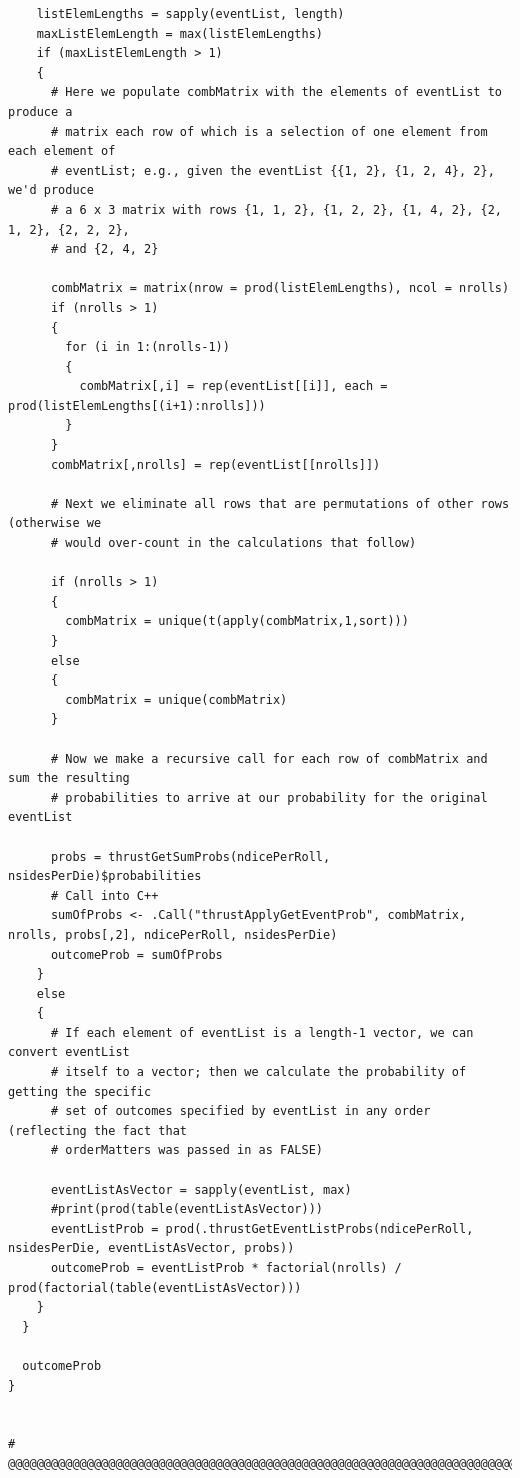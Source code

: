 \documentclass[12pt]{article}
\begin{document}
\begin{lstlisting}
    listElemLengths = sapply(eventList, length)
    maxListElemLength = max(listElemLengths)
    if (maxListElemLength > 1)
    {
      # Here we populate combMatrix with the elements of eventList to produce a 
      # matrix each row of which is a selection of one element from each element of
      # eventList; e.g., given the eventList {{1, 2}, {1, 2, 4}, 2}, we'd produce
      # a 6 x 3 matrix with rows {1, 1, 2}, {1, 2, 2}, {1, 4, 2}, {2, 1, 2}, {2, 2, 2},
      # and {2, 4, 2}
      
      combMatrix = matrix(nrow = prod(listElemLengths), ncol = nrolls)
      if (nrolls > 1)
      {
        for (i in 1:(nrolls-1))
        {
          combMatrix[,i] = rep(eventList[[i]], each = prod(listElemLengths[(i+1):nrolls]))
        }
      }
      combMatrix[,nrolls] = rep(eventList[[nrolls]])
      
      # Next we eliminate all rows that are permutations of other rows (otherwise we
      # would over-count in the calculations that follow)
      
      if (nrolls > 1)
      {
        combMatrix = unique(t(apply(combMatrix,1,sort)))
      }
      else
      {
        combMatrix = unique(combMatrix)
      }
      
      # Now we make a recursive call for each row of combMatrix and sum the resulting
      # probabilities to arrive at our probability for the original eventList
      
      probs = thrustGetSumProbs(ndicePerRoll, nsidesPerDie)$probabilities
      # Call into C++
      sumOfProbs <- .Call("thrustApplyGetEventProb", combMatrix, nrolls, probs[,2], ndicePerRoll, nsidesPerDie)
      outcomeProb = sumOfProbs
    }
    else
    {
      # If each element of eventList is a length-1 vector, we can convert eventList
      # itself to a vector; then we calculate the probability of getting the specific
      # set of outcomes specified by eventList in any order (reflecting the fact that 
      # orderMatters was passed in as FALSE)
      
      eventListAsVector = sapply(eventList, max)
      #print(prod(table(eventListAsVector)))
      eventListProb = prod(.thrustGetEventListProbs(ndicePerRoll, nsidesPerDie, eventListAsVector, probs))
      outcomeProb = eventListProb * factorial(nrolls) / prod(factorial(table(eventListAsVector)))
    }
  }
  
  outcomeProb
}


# @@@@@@@@@@@@@@@@@@@@@@@@@@@@@@@@@@@@@@@@@@@@@@@@@@@@@@@@@@@@@@@@@@@@@@@@@@@@@@@@@@@@



\end{lstlisting}
\end{document}
